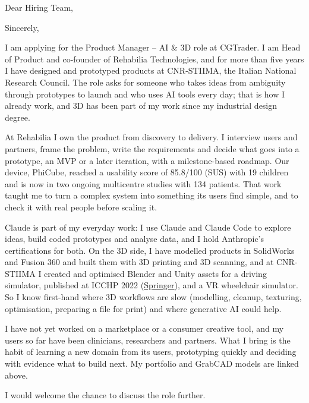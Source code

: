 \documentclass[11pt,a4paper,sans]{moderncv}
\begin{document}

\opening{Dear Hiring Team,}
\closing{Sincerely,}
\makelettertitle

I am applying for the Product Manager -- AI \& 3D role at CGTrader. I am Head of Product and co-founder of Rehabilia Technologies, and for more than five years I have designed and prototyped products at CNR-STIIMA, the Italian National Research Council. The role asks for someone who takes ideas from ambiguity through prototypes to launch and who uses AI tools every day; that is how I already work, and 3D has been part of my work since my industrial design degree.

At Rehabilia I own the product from discovery to delivery. I interview users and partners, frame the problem, write the requirements and decide what goes into a prototype, an MVP or a later iteration, with a milestone-based roadmap. Our device, PhiCube, reached a usability score of 85.8/100 (SUS) with 19 children and is now in two ongoing multicentre studies with 134 patients. That work taught me to turn a complex system into something its users find simple, and to check it with real people before scaling it.

Claude is part of my everyday work: I use Claude and Claude Code to explore ideas, build coded prototypes and analyse data, and I hold Anthropic's certifications for both. On the 3D side, I have modelled products in SolidWorks and Fusion 360 and built them with 3D printing and 3D scanning, and at CNR-STIIMA I created and optimised Blender and Unity assets for a driving simulator, published at ICCHP 2022 (\href{https://link.springer.com/chapter/10.1007/978-3-031-08645-8_56}{\color{blue}Springer}), and a VR wheelchair simulator. So I know first-hand where 3D workflows are slow (modelling, cleanup, texturing, optimisation, preparing a file for print) and where generative AI could help.

I have not yet worked on a marketplace or a consumer creative tool, and my users so far have been clinicians, researchers and partners. What I bring is the habit of learning a new domain from its users, prototyping quickly and deciding with evidence what to build next. My portfolio and GrabCAD models are linked above.

I would welcome the chance to discuss the role further.

\makeletterclosing
\end{document}
